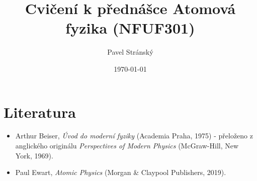 \documentclass[a4paper,11pt,twoside]{article}
\newcommand{\np}{\clearpage\newpage}
\begin{document}
\makeatletter
{}
\renewcommand{\theequation}{\arabic{section}.\arabic{subsection}.\arabic{equation}}
\makeatother

\title{Cvičení k přednášce Atomová fyzika (NFUF301)}
\date{\today}
\author{Pavel Stránský}

\maketitle
{}
\tableofcontents\np

\section*{Literatura}
\begin{itemize}
	\item Arthur Beiser, {\it Úvod do moderní fyziky} (Academia Praha, 1975) - přeloženo z anglického originálu {\it Perspectives of Modern Physics} (McGraw-Hill, New York, 1969).
	
	\item Paul Ewart, {\it Atomic Physics} (Morgan \& Claypool Publishers, 2019).
\end{itemize}

\np
\np
\np
\np
\np
\np
\np
\np
\np
\np

\printindex

%
\printbibliography
%
\end{document}
